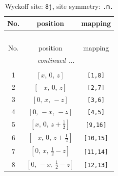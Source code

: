 \documentclass[fleqn,8pt]{jsarticle}
\begin{document}
\begin{longtable}{ccc}
\caption{Wyckoff site: {\tt 8j}, site symmetry: {\tt .m.}}
 \\
 \hline \hline
No. & position & mapping \\ \hline \endfirsthead

\multicolumn{2}{l}{\tablename\ \thetable{}} \\
 \hline \hline
No. & position & mapping \\ \hline \endhead

 \hline \hline
\multicolumn{2}{r}{\footnotesize\it continued ...} \\ \endfoot

 \hline \hline
\multicolumn{2}{r}{} \\ \endlastfoot

1 & $\left[ x,\, 0,\, z \right]$ & {\tt [1,8]} \\ \hline
2 & $\left[ - x,\, 0,\, z \right]$ & {\tt [2,7]} \\ \hline
3 & $\left[ 0,\, x,\, - z \right]$ & {\tt [3,6]} \\ \hline
4 & $\left[ 0,\, - x,\, - z \right]$ & {\tt [4,5]} \\ \hline
5 & $\left[ x,\, 0,\, z + \frac{1}{2} \right]$ & {\tt [9,16]} \\ \hline
6 & $\left[ - x,\, 0,\, z + \frac{1}{2} \right]$ & {\tt [10,15]} \\ \hline
7 & $\left[ 0,\, x,\, \frac{1}{2} - z \right]$ & {\tt [11,14]} \\ \hline
8 & $\left[ 0,\, - x,\, \frac{1}{2} - z \right]$ & {\tt [12,13]} \\
\end{longtable}
\renewcommand{\arraystretch}{1.2}
\end{document}
